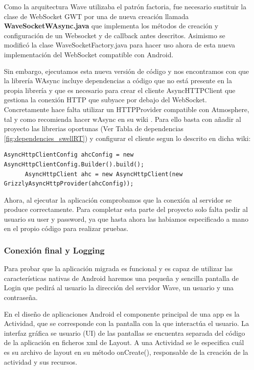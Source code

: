 	Como la arquitectura Wave utilizaba el patrón factoria, fue necesario sustituir la clase de WebSocket GWT por una de nueva creación llamada \textbf{WaveSocketWAsync.java}\cite{ref:wave_migration_github} que implementa los métodos de creación y configuración de un Websocket y de callback antes descritos. Asimismo se modificó la clase WaveSocketFactory.java para hacer uso ahora de esta nueva implementación del WebSocket compatible con Android. 
	
	Sin embargo, ejecutamos esta nueva versión de código y nos encontramos con que la librería WAsync incluye dependencias a código que no está presente en la propia librería y que es necesario para crear el cliente AsyncHTTPClient que gestiona la conexión HTTP que subyace por debajo del WebSocket. Concretamente hace falta utilizar un HTTPProvider compatible con Atmosphere, tal y como recomienda hacer wAsync en su wiki \cite{ref:httpProvider_wAsync}. Para ello basta con añadir al proyecto las librerias oportunas (Ver Tabla de dependencias \ref{fig:dependencies_swellRT}) y configurar el cliente segun lo descrito en dicha wiki:
		
	  \begin{lstlisting}[frame=single]	
	  AsyncHttpClientConfig ahcConfig = new AsyncHttpClientConfig.Builder().build();
	  AsyncHttpClient ahc = new AsyncHttpClient(new GrizzlyAsyncHttpProvider(ahcConfig));
	  \end{lstlisting}
      
      Ahora, al ejecutar la aplicación comprobamos que la conexión al servidor se produce correctamente. Para completar esta parte del proyecto solo falta pedir al usuario su user y password, ya que hasta ahora las habiamos especificado a mano en el propio código para realizar pruebas.
	    
    		\subsubsection{Conexión final y Logging}\label{sssec:conFinAndLogin}
    
    Para probar que la aplicación migrada es funcional y es capaz de utilizar las características nativas de Android haremos una pequeña y sencilla pantalla de Login que pedirá al usuario la dirección del servidor Wave, un usuario y una contraseña.
    
    En el diseño de aplicaciones Android el componente principal de una app es la Actividad, que se corresponde con la pantalla con la que interactúa el usuario. La interfaz gráfica se usuario (UI) de las pantallas se encuentra separada del código de la aplicación en ficheros xml de Layout\cite{ref:android_layout}. A una Actividad se le especifica cuál es su archivo de layout en su método onCreate(), responsable de la creación de la actividad y sus recursos. 
    
